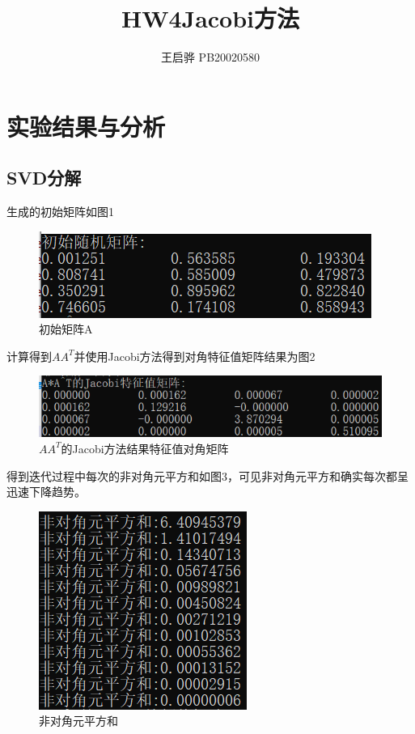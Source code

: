 \documentclass{article}
\title{\songti \zihao{2}\bfseries HW4Jacobi方法}
\author{王启骅 PB20020580}
\begin{document}
	\maketitle
	
	\section{实验结果与分析}
	
	\subsection{SVD分解}
	生成的初始矩阵如图1
		\begin{figure}[!h]
		
		\centering
		\includegraphics[scale=1]{A}
		\caption{\heiti{}初始矩阵A}
		
	\end{figure}


	计算得到$ AA^T $并使用Jacobi方法得到对角特征值矩阵结果为图2
		\begin{figure}[!h]
		
		\centering
		\includegraphics[scale=1]{EV}
		\caption{\heiti{}$ AA^T $的Jacobi方法结果特征值对角矩阵}
		
	\end{figure}


得到迭代过程中每次的非对角元平方和如图3，可见非对角元平方和确实每次都呈迅速下降趋势。
	\begin{figure}[!h]
	
	\centering
	\includegraphics[scale=1]{square_sum}
	\caption{\heiti{}非对角元平方和}
	
\end{figure}
\end{document}
